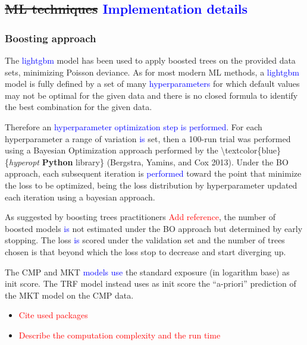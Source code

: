 \documentclass[
]{article}
\providecommand{\tightlist}{%
  \setlength{\itemsep}{0pt}\setlength{\parskip}{0pt}}
\begin{document}
\hypertarget{ml-techniques}{%
\subsection{\texorpdfstring{\sout{ML techniques}
\textcolor{blue}{Implementation details}}{ML techniques }}\label{ml-techniques}}

\hypertarget{boosting-approach}{%
\subsubsection{Boosting approach}\label{boosting-approach}}

The \textcolor{blue}{lightgbm} model has been used to apply boosted
trees on the provided data sets, minimizing Poisson deviance. As for
most modern ML methods, a \textcolor{blue}{lightgbm} model is fully
defined by a set of many \textcolor{blue}{hyperparameters} for which
default values may not be optimal for the given data and there is no
closed formula to identify the best combination for the given data.

Therefore an
\textcolor{blue}{hyperparameter optimization step is performed}. For
each hyperparameter a range of variation \textcolor{blue}{is} set, then
a 100-run trial was performed using a Bayesian Optimization approach
performed by the \textbackslash textcolor\{blue\}\{\emph{hyperopt}
\textbf{Python} library\} (Bergstra, Yamins, and Cox 2013). Under the BO
approach, each subsequent iteration is \textcolor{blue}{performed}
toward the point that minimize the loss to be optimized, being the loss
distribution by hyperparameter updated each iteration using a bayesian
approach.

As suggested by boosting trees practitioners
\textcolor{red}{Add reference}, the number of boosted models
\textcolor{blue}{is} not estimated under the BO approach but determined
by early stopping. The loss \textcolor{blue}{is} scored under the
validation set and the number of trees chosen is that beyond which the
loss stop to decrease and start diverging up.

The CMP and MKT \textcolor{blue}{models use} the standard exposure (in
logarithm base) as init score. The TRF model instead uses as init score
the ``a-priori'' prediction of the MKT model on the CMP data.

\begin{itemize}
\tightlist
\item
  \textcolor{red}{Cite used packages}
\item
  \textcolor{red}{Describe the computation complexity and the run time}
\end{itemize}
\end{document}
